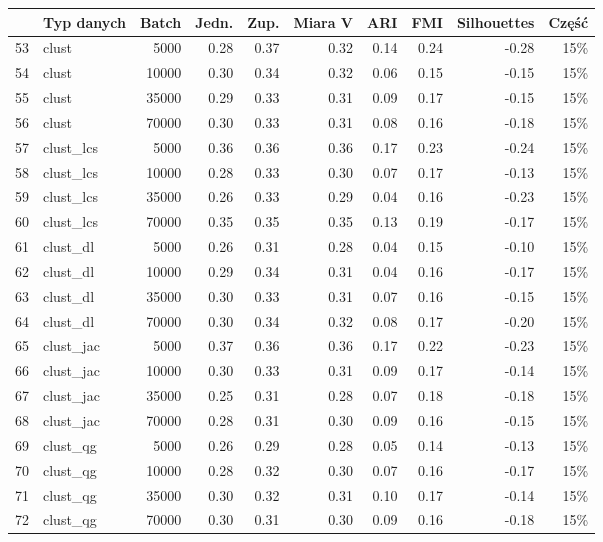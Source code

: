 \documentclass{praca1}
\begin{document}
\begin{table}[!h]
\centering
\begin{tabular}{|rlr|rrr|rr|r|r|}
  \hline
 & Typ danych & Batch & Jedn. & Zup. & Miara V & ARI & FMI & Silhouettes & Część \\ 
  \hline
53 & clust & 5000 & 0.28 & 0.37 & 0.32 & 0.14 & 0.24 & -0.28 & 15\% \\ 
  54 & clust & 10000 & 0.30 & 0.34 & 0.32 & 0.06 & 0.15 & -0.15 & 15\% \\ 
  55 & clust & 35000 & 0.29 & 0.33 & 0.31 & 0.09 & 0.17 & -0.15 & 15\% \\ 
  56 & clust & 70000 & 0.30 & 0.33 & 0.31 & 0.08 & 0.16 & -0.18 & 15\% \\ 
   \hline
57 & clust\_lcs & 5000 & 0.36 & 0.36 & 0.36 & 0.17 & 0.23 & -0.24 & 15\% \\ 
  58 & clust\_lcs & 10000 & 0.28 & 0.33 & 0.30 & 0.07 & 0.17 & -0.13 & 15\% \\ 
  59 & clust\_lcs & 35000 & 0.26 & 0.33 & 0.29 & 0.04 & 0.16 & -0.23 & 15\% \\ 
  60 & clust\_lcs & 70000 & 0.35 & 0.35 & 0.35 & 0.13 & 0.19 & -0.17 & 15\% \\ 
   \hline
61 & clust\_dl & 5000 & 0.26 & 0.31 & 0.28 & 0.04 & 0.15 & -0.10 & 15\% \\ 
  62 & clust\_dl & 10000 & 0.29 & 0.34 & 0.31 & 0.04 & 0.16 & -0.17 & 15\% \\ 
  63 & clust\_dl & 35000 & 0.30 & 0.33 & 0.31 & 0.07 & 0.16 & -0.15 & 15\% \\ 
  64 & clust\_dl & 70000 & 0.30 & 0.34 & 0.32 & 0.08 & 0.17 & -0.20 & 15\% \\ 
   \hline
65 & clust\_jac & 5000 & 0.37 & 0.36 & 0.36 & 0.17 & 0.22 & -0.23 & 15\% \\ 
  66 & clust\_jac & 10000 & 0.30 & 0.33 & 0.31 & 0.09 & 0.17 & -0.14 & 15\% \\ 
  67 & clust\_jac & 35000 & 0.25 & 0.31 & 0.28 & 0.07 & 0.18 & -0.18 & 15\% \\ 
  68 & clust\_jac & 70000 & 0.28 & 0.31 & 0.30 & 0.09 & 0.16 & -0.15 & 15\% \\ 
   \hline
69 & clust\_qg & 5000 & 0.26 & 0.29 & 0.28 & 0.05 & 0.14 & -0.13 & 15\% \\ 
  70 & clust\_qg & 10000 & 0.28 & 0.32 & 0.30 & 0.07 & 0.16 & -0.17 & 15\% \\ 
  71 & clust\_qg & 35000 & 0.30 & 0.32 & 0.31 & 0.10 & 0.17 & -0.14 & 15\% \\ 
  72 & clust\_qg & 70000 & 0.30 & 0.31 & 0.30 & 0.09 & 0.16 & -0.18 & 15\% \\ 

\end{tabular}
\end{table}
\end{document}

